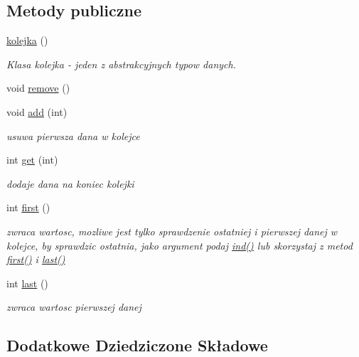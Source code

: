 \subsection*{Metody publiczne}
\begin{DoxyCompactItemize}
\item 
\hyperlink{classkolejka_ae9205d86a1f136649fac28615878729c}{kolejka} ()
\begin{DoxyCompactList}\small\item\em Klasa kolejka -\/ jeden z abstrakcyjnych typow danych. \end{DoxyCompactList}\item 
void \hyperlink{classkolejka_a38392eb78d5c659ed90aff8a8d8b078d}{remove} ()
\item 
void \hyperlink{classkolejka_a2b9a60c6e42764a419e6e7347c2f4227}{add} (int)
\begin{DoxyCompactList}\small\item\em usuwa pierwsza dana w kolejce \end{DoxyCompactList}\item 
int \hyperlink{classkolejka_aaaccee425d5589570c01d67fa5a0b3e7}{get} (int)
\begin{DoxyCompactList}\small\item\em dodaje dana na koniec kolejki \end{DoxyCompactList}\item 
int \hyperlink{classkolejka_a0c4bda6901284547852147a9a4f2d2f5}{first} ()
\begin{DoxyCompactList}\small\item\em zwraca wartosc, mozliwe jest tylko sprawdzenie ostatniej i pierwszej danej w kolejce, by sprawdzic ostatnia, jako argument podaj \hyperlink{classatp2_a8550469d6d715c7b9980bda8b94c514e}{ind()} lub skorzystaj z metod \hyperlink{classkolejka_a0c4bda6901284547852147a9a4f2d2f5}{first()} i \hyperlink{classkolejka_ac901b09064b29221205d37bb5d822c93}{last()} \end{DoxyCompactList}\item 
int \hyperlink{classkolejka_ac901b09064b29221205d37bb5d822c93}{last} ()
\begin{DoxyCompactList}\small\item\em zwraca wartosc pierwszej danej \end{DoxyCompactList}\end{DoxyCompactItemize}
\subsection*{Dodatkowe Dziedziczone Składowe}


